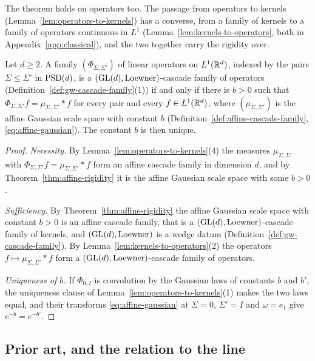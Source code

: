 The theorem holds on operators too. The passage from operators to kernels
(Lemma~\ref{lem:operators-to-kernels}) has a converse, from a family of kernels to a
family of operators continuous in $L^1$ (Lemma~\ref{lem:kernels-to-operators}, both in
Appendix~\ref{app:classical}), and the two together carry the rigidity over.

\begin{theorem}\label{thm:affine-rigidity-operators}
Let $d \ge 2$. A family $(\Phi_{\Sigma,\Sigma'})$ of linear operators on $L^1(\mathbb{R}^d)$, indexed by the
pairs $\Sigma \le \Sigma'$ in $\mathrm{PSD}(d)$, is a $(\mathrm{GL}(d), \text{Loewner})$-cascade family of operators
(Definition~\ref{def:gw-cascade-family}(1)) if and only if there is $b > 0$ such that
$\Phi_{\Sigma,\Sigma'}f = \mu_{\Sigma,\Sigma'} * f$ for every pair and every $f \in L^1(\mathbb{R}^d)$, where
$(\mu_{\Sigma,\Sigma'})$ is the affine Gaussian scale space with constant $b$
(Definition~\ref{def:affine-cascade-family}, \ref{eq:affine-gaussian}). The constant $b$ is then unique.
\end{theorem}

\begin{proof}
\emph{Necessity.} By Lemma~\ref{lem:operators-to-kernels}(4) the measures $\mu_{\Sigma,\Sigma'}$
with $\Phi_{\Sigma,\Sigma'}f = \mu_{\Sigma,\Sigma'} * f$ form an affine cascade family in dimension
$d$, and by Theorem~\ref{thm:affine-rigidity} it is the affine Gaussian scale space with some $b > 0$.

\emph{Sufficiency.} By Theorem~\ref{thm:affine-rigidity} the affine Gaussian scale space with constant
$b > 0$ is an affine cascade family, that is a $(\mathrm{GL}(d), \text{Loewner})$-cascade family of kernels,
and $(\mathrm{GL}(d), \text{Loewner})$ is a wedge datum (Definition~\ref{def:gw-cascade-family}). By
Lemma~\ref{lem:kernels-to-operators}(2) the operators $f \mapsto \mu_{\Sigma,\Sigma'} * f$ form a
$(\mathrm{GL}(d), \text{Loewner})$-cascade family of operators.

\emph{Uniqueness of $b$.} If $\Phi_{0,I}$ is convolution by the Gaussian laws of constants $b$ and
$b'$, the uniqueness clause of Lemma~\ref{lem:operators-to-kernels}(1) makes the two laws equal, and their
transforms \ref{eq:affine-gaussian} at $\Sigma = 0$, $\Sigma' = I$ and $\omega = e_1$ give
$e^{-b} = e^{-b'}$.
\end{proof}

\subsection{Prior art, and the relation to the line}\label{sec:classical-prior-art}

